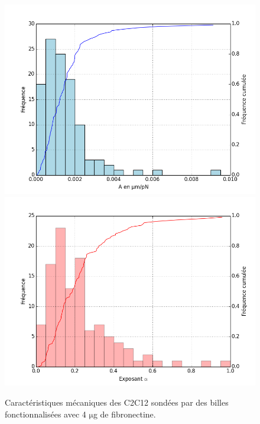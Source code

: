 \documentclass                                                                                                                                                                                                                                                                                                                                       {report}
\newcommand{\micro}{$\mathrm{\mu}$}
\begin{document}
\begin{figure}[p]
\includegraphics[scale=0.5]{Figures/A0_Toutes.png} 
\includegraphics[scale=0.5]{Figures/E0_Toutes.png} 
\caption{Caractéristiques mécaniques des C2C12 sondées par des billes fonctionnalisées avec 4 \micro g de fibronectine.}
\end{figure}
\end{document}
